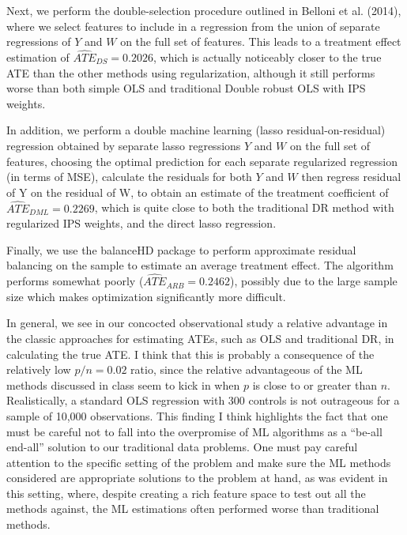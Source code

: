 \documentclass{article}
\begin{document}
Next, we perform the double-selection procedure outlined in Belloni et al. (2014), where we select features to include in a regression from the union of separate regressions of $Y$ and $W$ on the full set of features.
This leads to a treatment effect estimation of $\widehat{ATE}_{DS}=0.2026$, which is actually noticeably closer to the true ATE than the other methods using regularization, although it still performs worse than both simple OLS and traditional Double robust OLS with IPS weights.

In addition, we perform a double machine learning (lasso residual-on-residual) regression obtained by separate lasso regressions $Y$ and $W$ on the full set of features, choosing the optimal prediction for each separate regularized regression (in terms of MSE), calculate the residuals for both $Y$ and $W$ then regress residual of Y on the residual of W, to obtain an estimate of the treatment coefficient of $\widehat{ATE}_{DML}=0.2269$, which is quite close to both the traditional DR method with regularized IPS weights, and the direct lasso regression. 

Finally, we use the balanceHD package to perform approximate residual balancing on the sample to estimate an average treatment effect. The algorithm performs somewhat poorly ($\widehat{ATE}_{ARB}=0.2462$), possibly due to the large sample size which makes optimization significantly more difficult.

In general, we see in our concocted observational study a relative advantage in the classic approaches for estimating ATEs, such as OLS and traditional DR, in calculating the true ATE. I think that this is probably a consequence of the relatively low $p/n=0.02$ ratio, since the relative advantageous of the ML methods discussed in class seem to kick in when $p$ is close to or greater than $n$. Realistically, a standard OLS regression with 300 controls is not outrageous for a sample of 10,000 observations. This finding I think highlights the fact that one must be careful not to fall into the overpromise of ML algorithms as a ``be-all end-all'' solution to our traditional data problems. One must pay careful attention to the specific setting of the problem and make sure the ML methods considered are appropriate solutions to the problem at hand, as was evident in this setting, where, despite creating a rich feature space to test out all the methods against, the ML estimations often performed worse than traditional methods.
\end{document}
